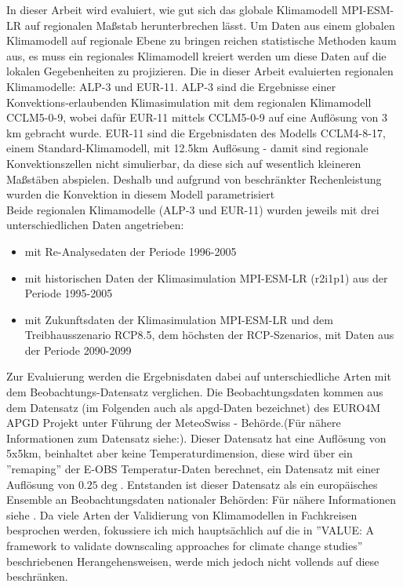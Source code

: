 In dieser Arbeit wird evaluiert, wie gut sich das globale Klimamodell MPI-ESM-LR \cite{mpi-esm-lr} auf regionalen Maßstab herunterbrechen lässt. 
Um Daten aus einem globalen Klimamodell auf regionale Ebene zu bringen reichen statistische Methoden kaum aus, es muss ein regionales Klimamodell kreiert werden um diese Daten auf die lokalen Gegebenheiten zu projizieren. Die in dieser Arbeit evaluierten regionalen Klimamodelle: ALP-3 und EUR-11. ALP-3 sind  die Ergebnisse einer Konvektions-erlaubenden Klimasimulation mit dem regionalen Klimamodell CCLM5-0-9, wobei dafür EUR-11 mittels CCLM5-0-9 auf eine Auflösung von 3 km gebracht wurde. EUR-11 sind die Ergebnisdaten des Modells CCLM4-8-17, einem Standard-Klimamodell, mit 12.5km Auflösung - damit sind regionale Konvektionszellen nicht simulierbar, da diese sich auf wesentlich kleineren Maßstäben abspielen. Deshalb und aufgrund von beschränkter Rechenleistung wurden die Konvektion in diesem Modell parametrisiert\\
Beide regionalen Klimamodelle (ALP-3 und EUR-11) wurden jeweils mit drei unterschiedlichen Daten angetrieben: 
\begin{itemize}
	\item mit Re-Analysedaten der Periode 1996-2005
	\item mit historischen Daten der Klimasimulation MPI-ESM-LR (r2i1p1) aus der Periode 1995-2005
	\item mit Zukunftsdaten der Klimasimulation MPI-ESM-LR und dem Treibhausszenario RCP8.5, dem höchsten der RCP-Szenarios, mit Daten aus der Periode 2090-2099
\end{itemize}
Zur Evaluierung werden die Ergebnisdaten dabei auf unterschiedliche Arten mit dem Beobachtungs-Datensatz verglichen. Die Beobachtungsdaten kommen aus dem Datensatz (im Folgenden auch als apgd-Daten bezeichnet) des EURO4M APGD Projekt unter Führung der MeteoSwiss - Behörde\cite{meteoswiss}.(Für nähere Informationen zum Datensatz siehe:\cite{apgd}). Dieser Datensatz hat eine Auflösung von 5x5km, beinhaltet aber keine Temperaturdimension, diese wird über ein ''remaping'' der E-OBS Temperatur-Daten berechnet, ein Datensatz mit einer Auflösung von $0.25\deg$. Entstanden ist dieser Datensatz als ein europäisches Ensemble an Beobachtungsdaten nationaler Behörden: Für nähere Informationen siehe \cite{eobs}.
Da viele Arten der Validierung von Klimamodellen in Fachkreisen besprochen werden, fokussiere ich mich hauptsächlich auf die in ''VALUE: A framework to validate downscaling approaches for climate change studies'' \cite{maraun_value} beschriebenen Herangehensweisen, werde mich jedoch nicht vollends auf diese beschränken.
